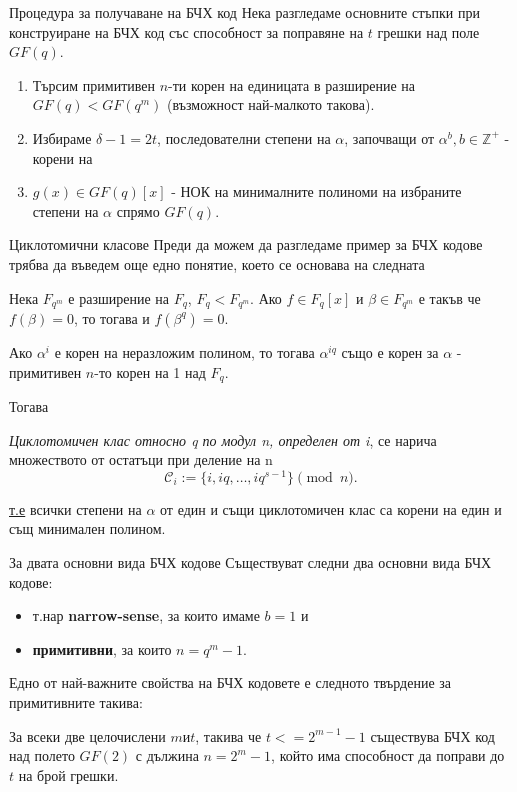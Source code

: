 \documentclass[numbering=fraction]{beamer}
\begin{document}
\begin{frame}{Процедура за получаване на БЧХ код}
Нека разгледаме основните стъпки при конструиране на БЧХ код със способност за
поправяне на $t$ грешки над поле $GF(q)$.
\begin{enumerate}
\item Търсим примитивен $n$-ти корен на единицата в разширение на $GF(q) <
GF(q^m)$ (възможност най-малкото такова).
\item Избираме $\delta - 1 = 2t$, последователни степени на $\alpha$, започващи
от $\alpha^b, b \in \mathbb{Z^+}$ - корени на
\item $g(x) \in GF(q)[x]$ - НОК на минималните полиноми на избраните степени на
$\alpha$ спрямо $GF(q)$.
\end{enumerate}
\end{frame}

\begin{frame}{Циклотомични класове}
Преди да можем да разгледаме пример за БЧХ кодове трябва да въведем още едно
понятие, което се основава на следната
\begin{lemma}
\smallskip
Нека $F_{q^m}$ е разширение на $F_q$, $F_q < F_{q^m}$. Ако $f \in F_q[x]$ и $\beta \in F_{q^m}$ е
такъв че $f(\beta) = 0$, то тогава и $f(\beta^q) = 0$.
\end{lemma}
\begin{corollary}
\smallskip
Ако $\alpha^i$ е корен на неразложим полином, то тогава $\alpha^{iq}$ също е
корен за $\alpha$ - примитивен $n$-то корен на 1 над $F_q$.
\end{corollary}
\end{frame}

\begin{frame}
Тогава
\begin{definition}
\smallskip
\emph{Циклотомичен клас относно q по модул n, определен от i}, се нарича
множеството от остатъци при деление на n \[
	\mathcal{C}_i := \{i, iq, \dots, iq^{s - 1}\} \pmod{n}.
\]
\end{definition}
\underline{т.е} всички степени на $\alpha$ от един и същи циклотомичен клас
са корени на един и същ минимален полином.
\end{frame}

\begin{frame}{За двата основни вида БЧХ кодове}
Съществуват следни два основни вида БЧХ кодове:
\begin{itemize}
\item т.нар \textbf{narrow-sense}, за които имаме $b = 1$ и
\item \textbf{примитивни}, за които $n = q^m - 1$.
\end{itemize}
\smallskip
Едно от най-важните свойства на БЧХ кодовете е следното твърдение за
примитивните такива:
\begin{theorem}\label{thm:primitive-bch-code}
\smallskip
За всеки две целочислени $m и t$, такива че $t <= 2^{m - 1} - 1$ съществува БЧХ
код над полето $GF(2)$ с дължина $n = 2^m - 1$, който има способност да поправи
до $t$ на брой грешки.
\end{theorem}
\end{frame}
\end{document}
